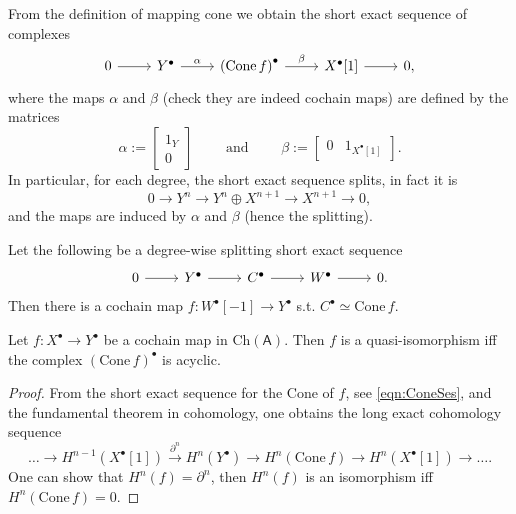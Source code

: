 \begin{rem}[]
	From the definition of mapping cone we obtain the short exact sequence of complexes
	\begin{equation}\label{eqn:ConeSes}
	\begin{tikzcd}
		0 \arrow[r, "", rightarrow] &
		Y^\bullet \arrow[r, "\alpha", rightarrow] &
		\left( \mathrm{Cone}\, f \right)^\bullet \arrow[r, "\beta", rightarrow] &
		X^\bullet[1] \arrow[r, "", rightarrow] &
		0
	,\end{tikzcd}
	\end{equation}
	where the maps $\alpha$ and $\beta$ (check they are indeed cochain maps) are defined by the matrices
	\begin{equation}
	\alpha := 
	\begin{bmatrix}
		1_Y \\ 0
	\end{bmatrix} \qquad \text{ and } \qquad
	\beta := 
	\begin{bmatrix}
		0 & 1_{X^\bullet[1]}
	\end{bmatrix} 
	.\end{equation} 
	In particular, for each degree, the short exact sequence splits, in fact it is
	\begin{equation}
	0 \to Y^n \to Y^n \oplus X^{n+1} \to X^{n+1} \to 0
	,\end{equation} 
	and the maps are induced by $\alpha$ and $\beta$ (hence the splitting).
\end{rem}

\begin{lem}
	Let the following be a degree-wise splitting short exact sequence
	\begin{equation*}
	\begin{tikzcd}
		0 \arrow[r, "", rightarrow] &
		Y^\bullet \arrow[r, "", rightarrow] &
		C^\bullet \arrow[r, "", rightarrow] &
		W^\bullet \arrow[r, "", rightarrow] &
		0
	.\end{tikzcd}
	\end{equation*}
	Then there is a cochain map $f: W^\bullet[-1] \to Y^\bullet$ s.t.
	$C^\bullet \simeq \mathrm{Cone}\, f$.
\end{lem} 

\begin{lem}
	Let $f\colon X^\bullet \to Y^\bullet$ be a cochain map in $\mathrm{Ch}(\mathsf{A})$.
	Then $f$ is a quasi-isomorphism iff the complex
	$(\mathrm{Cone}\, f)^\bullet$ is acyclic.
\end{lem} 
\begin{proof}
	From the short exact sequence for the Cone of $f$, see \eqref{eqn:ConeSes}, and the 
	fundamental theorem in cohomology, one obtains the long exact cohomology sequence
	\begin{equation}
		\ldots \to H^{n-1}(X^\bullet[1]) \xrightarrow{\partial^n} H^n(Y^\bullet) \to
		H^n(\mathrm{Cone}\, f) \to H^n(X^\bullet[1]) \to \ldots
	.\end{equation} 
	One can show that $H^n(f) = \partial^n$, then
	$H^n(f)$ is an isomorphism iff $H^n(\mathrm{Cone}\, f) = 0$.
\end{proof}

